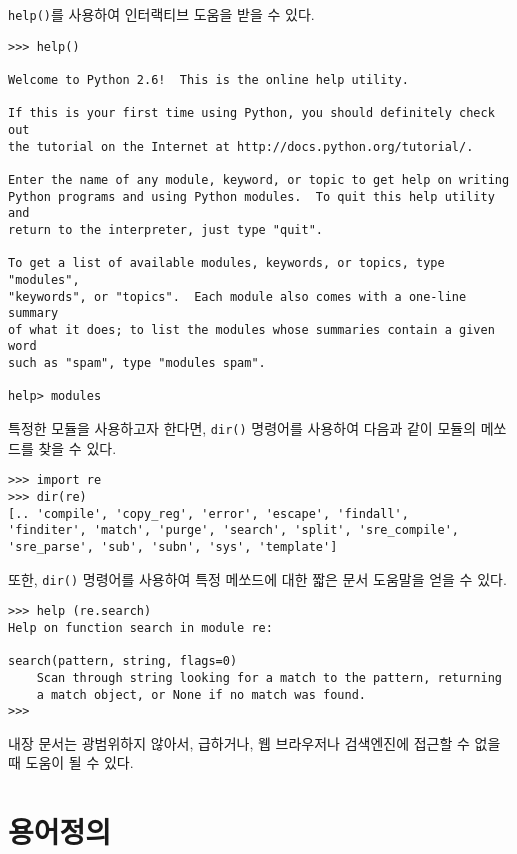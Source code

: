 {\tt help()}를 사용하여 인터랙티브 도움을 받을 수 있다.

\beforeverb
\begin{verbatim}
>>> help()

Welcome to Python 2.6!  This is the online help utility.

If this is your first time using Python, you should definitely check out
the tutorial on the Internet at http://docs.python.org/tutorial/.

Enter the name of any module, keyword, or topic to get help on writing
Python programs and using Python modules.  To quit this help utility and
return to the interpreter, just type "quit".

To get a list of available modules, keywords, or topics, type "modules",
"keywords", or "topics".  Each module also comes with a one-line summary
of what it does; to list the modules whose summaries contain a given word
such as "spam", type "modules spam".

help> modules
\end{verbatim}
\afterverb
%

특정한 모듈을 사용하고자 한다면, {\tt dir()} 명령어를 사용하여 다음과 같이 모듈의 메쏘드를 찾을 수 있다.

\beforeverb
\begin{verbatim}
>>> import re
>>> dir(re)
[.. 'compile', 'copy_reg', 'error', 'escape', 'findall', 
'finditer', 'match', 'purge', 'search', 'split', 'sre_compile', 
'sre_parse', 'sub', 'subn', 'sys', 'template']
\end{verbatim}
\afterverb
%

또한, {\tt dir()} 명령어를 사용하여 특정 메쏘드에 대한 짧은 문서 도움말을 얻을 수 있다.

\beforeverb
\begin{verbatim}
>>> help (re.search)
Help on function search in module re:

search(pattern, string, flags=0)
    Scan through string looking for a match to the pattern, returning
    a match object, or None if no match was found.
>>> 
\end{verbatim}
\afterverb
%

내장 문서는 광범위하지 않아서, 급하거나, 웹 브라우저나 검색엔진에 접근할 수 없을 때 도움이 될 수 있다.

\section{용어정의}

